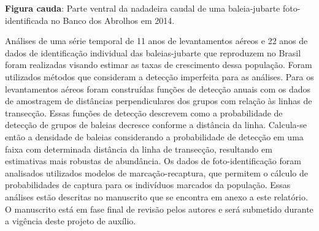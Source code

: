 \textbf{Figura cauda}: Parte ventral da nadadeira caudal de uma baleia-jubarte foto-identificada  no Banco dos Abrolhos em 2014.

Análises de uma série temporal de 11 anos de levantamentos aéreos e 22 anos de dados de identificação individual das baleias-jubarte que reproduzem no Brasil foram realizadas visando estimar as taxas de crescimento dessa população. Foram utilizados métodos que consideram a detecção imperfeita para as análises. Para os levantamentos aéreos foram construídas funções de detecção anuais com os dados de amostragem de distâncias perpendiculares dos grupos com relação às linhas de transecção. Essas funções de detecção descrevem como a probabilidade de detecção de grupos de baleias decresce conforme a distância da linha. Calcula-se então a densidade de baleias considerando a probabilidade de detecção em uma faixa com determinada distância da linha de transecção, resultando em estimativas mais robustas de abundância. Os dados de foto-identificação foram analisados utilizados modelos de marcação-recaptura, que permitem o cálculo de probabilidades de captura para os indivíduos marcados da população. Essas análises estão descritas no manuscrito que se encontra em anexo a este relatório. O manuscrito está em fase final de revisão pelos autores e será submetido durante a vigência deste projeto de auxílio.